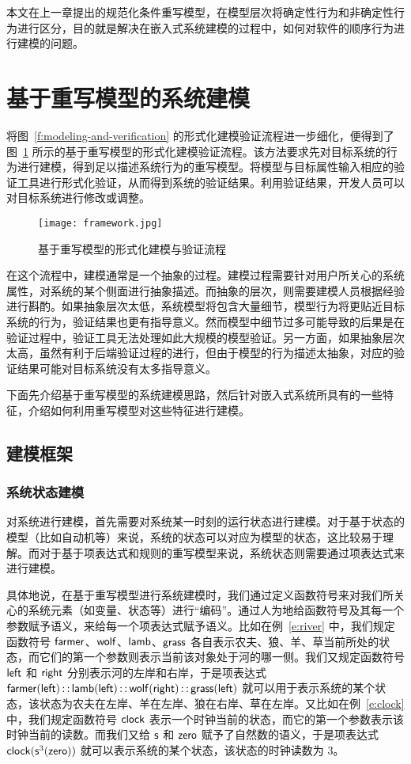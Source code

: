 本文在上一章提出的规范化条件重写模型，在模型层次将确定性行为和非确定性行为进行区分，目的就是解决在嵌入式系统建模的过程中，如何对软件的顺序行为进行建模的问题。

\section{基于重写模型的系统建模}
\label{s:modeling}

将图~\ref{f:modeling-and-verification} 的形式化建模验证流程进一步细化，便得到了图~\ref{f:framework} 所示的基于重写模型的形式化建模验证流程。该方法要求先对目标系统的行为进行建模，得到足以描述系统行为的重写模型。将模型与目标属性输入相应的验证工具进行形式化验证，从而得到系统的验证结果。利用验证结果，开发人员可以对目标系统进行修改或调整。

\begin{figure}[ht]
\centering
\texttt{[image: framework.jpg]}
\caption{基于重写模型的形式化建模与验证流程}
\label{f:framework}
\end{figure}

在这个流程中，建模通常是一个抽象的过程。建模过程需要针对用户所关心的系统属性，对系统的某个侧面进行抽象描述。而抽象的层次，则需要建模人员根据经验进行斟酌。如果抽象层次太低，系统模型将包含大量细节，模型行为将更贴近目标系统的行为，验证结果也更有指导意义。然而模型中细节过多可能导致的后果是在验证过程中，验证工具无法处理如此大规模的模型验证。另一方面，如果抽象层次太高，虽然有利于后端验证过程的进行，但由于模型的行为描述太抽象，对应的验证结果可能对目标系统没有太多指导意义。

下面先介绍基于重写模型的系统建模思路，然后针对嵌入式系统所具有的一些特征，介绍如何利用重写模型对这些特征进行建模。

\subsection{建模框架}

\subsubsection{系统状态建模}
\label{sss:state-modeling}

对系统进行建模，首先需要对系统某一时刻的运行状态进行建模。对于基于状态的模型（比如自动机等）来说，系统的状态可以对应为模型的状态，这比较易于理解。而对于基于项表达式和规则的重写模型来说，系统状态则需要通过项表达式来进行建模。

具体地说，在基于重写模型进行系统建模时，我们通过定义函数符号来对我们所关心的系统元素（如变量、状态等）进行“编码”。通过人为地给函数符号及其每一个参数赋予语义，来给每一个项表达式赋予语义。比如在例~\ref{e:river} 中，我们规定函数符号 $\operatorname{\mathsf{farmer}}$、$\operatorname{\mathsf{wolf}}$、$\operatorname{\mathsf{lamb}}$、$\operatorname{\mathsf{grass}}$ 各自表示农夫、狼、羊、草当前所处的状态，而它们的第一个参数则表示当前该对象处于河的哪一侧。我们又规定函数符号 $\operatorname{\mathsf{left}}$ 和 $\operatorname{\mathsf{right}}$ 分别表示河的左岸和右岸，于是项表达式 $\operatorname{\mathsf{farmer}}(\operatorname{\mathsf{left}}) \operatorname{\mathsf{::}} \operatorname{\mathsf{lamb}}(\operatorname{\mathsf{left}}) \operatorname{\mathsf{::}} \operatorname{\mathsf{wolf}}(\operatorname{\mathsf{right}}) \operatorname{\mathsf{::}} \operatorname{\mathsf{grass}}(\operatorname{\mathsf{left}})$ 就可以用于表示系统的某个状态，该状态为农夫在左岸、羊在左岸、狼在右岸、草在左岸。又比如在例~\ref{e:clock} 中，我们规定函数符号 $\operatorname{\mathsf{clock}}$ 表示一个时钟当前的状态，而它的第一个参数表示该时钟当前的读数。而我们又给 $\operatorname{\mathsf{s}}$ 和 $\operatorname{\mathsf{zero}}$ 赋予了自然数的语义，于是项表达式 $\operatorname{\mathsf{clock}}(\operatorname{\mathsf{s}}^3(\operatorname{\mathsf{zero}}))$ 就可以表示系统的某个状态，该状态的时钟读数为 3。


